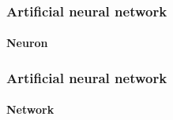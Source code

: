 \documentclass[9pt]{beamer}
\begin{document}
\begin{frame}
  \frametitle{Artificial neural network}

  \framesubtitle{Neuron}

  \begin{center}
    \scalebox{0.6}{
      
    }
  \end{center}


\end{frame}

\begin{frame}
  \frametitle{Artificial neural network}

  \framesubtitle{Network}

  \begin{center}
    \scalebox{0.7}{
      
    }
  \end{center}
\end{frame}




\end{document}
